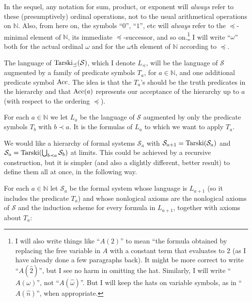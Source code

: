 \documentclass{amsart}
\begin{document}
In the sequel, any notation for sum, product, or exponent will {\it always} refer to these (presumptively)
ordinal operations, not to the usual arithmetical operations on $\mathbb{N}$. Also, from here on, the
symbols ``$0$'', ``$1$'', etc will {\it always} refer to the $\preceq$-minimal element of $\mathbb{N}$, its
immediate $\preceq$-successor, and so on.\footnote{I will also write things like ``$A(2)$'' to mean ``the
formula obtained by replacing the free variable in $A$ with a constant term that evaluates to $2$ (as
I have already done a few paragraphs back). It might be more correct to write ``$A(\hat{2})$'', but I see
no harm in omitting the hat. Similarly, I will write ``$A(\omega)$'', not ``$A(\hat{\omega})$''. But I will
keep the hats on variable symbols, as in ``$A(\hat{n})$'', when appropriate.}
I will write ``$\omega$'' both for the actual ordinal $\omega$
and for the $\omega$th element of $\mathbb{N}$ according to $\preceq$.

The language of ${\rm Tarski}_{\preceq}(\mathcal{S})$, which I denote $L_{\preceq}$, will be the
language of $\mathcal{S}$ augmented
by a family of predicate symbols $T_a$, for $a \in \mathbb{N}$, and one additional predicate symbol
${\rm Acc}$. The idea is that the $T_a$'s should be the truth predicates in the hierarchy and that
${\rm Acc}(a)$ represents our acceptance of the hierarchy up to $a$ (with respect to the ordering
$\preceq$).

For each $a \in \mathbb{N}$ we let $L_a$ be the language of $\mathcal{S}$ augmented by only the
predicate symbols $T_b$ with $b \prec a$. It is the formulas of $L_a$ to which we want to apply
$T_a$.

We would like a hierarchy of formal systems $\mathcal{S}_a$ with $\mathcal{S}_{a + 1} =
{\rm Tarski}(\mathcal{S}_a)$ and $\mathcal{S}_a = {\rm Tarski}(\bigcup_{b \prec a} \mathcal{S}_b)$ at limits.
This could be achieved by a recursive construction, but it is simpler (and also a slightly different, better
result) to define them all at once, in the following way.

For each $a \in \mathbb{N}$ let $\mathcal{S}_a$ be the formal system whose language is $L_{a+1}$
(so it includes the predicate $T_a$) and whose nonlogical axioms are the nonlogical axioms of $\mathcal{S}$
and the induction scheme for every formula in $L_{a+1}$,  together with axioms about $T_a$:
\end{document}
